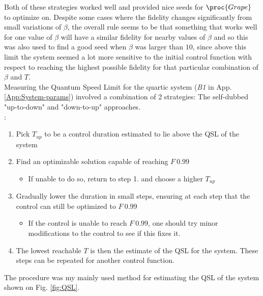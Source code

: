 \documentclass[a4paper, twocolumn]{revtex4-1}
\begin{document}
Both of these strategies worked well and provided nice seeds for $\proc{Grape}$ to optimize on. Despite some cases where the fidelity changes significantly from small variations of $\beta$, the overall rule seems to be that something that works well for one value of $\beta$ will have a similar fidelity for nearby values of $\beta$ and so this was also used to find a good seed when $\beta$ was larger than $10$, since above this limit the system seemed a lot more sensitive to the initial control function with respect to reaching the highest possible fidelity for that particular combination of $\beta$ and $T$. \\

Measuring the Quantum Speed Limit for the quartic system (\textit{B1} in App. \ref{App:System-params}) involved a combination of 2 strategies: The self-dubbed "up-to-down" and "down-to-up" approaches. \\

:
\begin{enumerate}
	\item Pick $T_{up}$ to be a control duration estimated to lie above the QSL of the system
	\item Find an optimizable solution capable of reaching $F~0.99$
	\begin{itemize}
		\item If unable to do so, return to step 1. and choose a higher $T_{up}$
	\end{itemize}
	\item Gradually lower the duration in small steps, ensuring at each step that the control can still be optimized to $F~0.99$
	\begin{itemize}
		\item If the control is unable to reach $F~0.99$, one should try minor modifications to the control to see if this fixes it.
	\end{itemize}
	\item The lowest reachable $T$ is then the estimate of the QSL for the system. These steps can be repeated for another control function.
\end{enumerate}
The  procedure was my mainly used method for estimating the QSL of the system shown on Fig. \ref{fig:QSL}.\\
\end{document}
